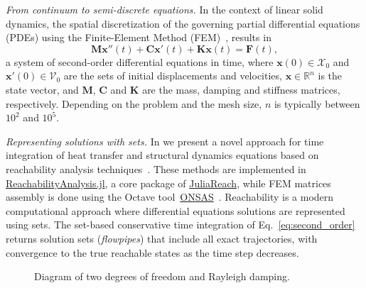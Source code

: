 \documentclass{juliacon}
\begin{document}
	


\maketitle

\emph{From continuum to semi-discrete equations.} In the context of linear solid dynamics, the spatial discretization of the governing partial differential equations (PDEs) using the Finite-Element Method (FEM)~\cite{Bathe2014}, results in
%
\begin{equation}\label{eq:second_order}
\mathbf{M} \mathbf{x}''(t) + \mathbf{C}\mathbf{x}'(t) + \mathbf{K}\mathbf{x}(t) = \mathbf{F}(t),
\end{equation}
%
a system of second-order differential equations in time, where $\mathbf{x}(0) \in \mathcal{X}_0$ and $\mathbf{x}'(0) \in \mathcal{V}_0$ are the sets of initial displacements and velocities, $\mathbf{x} \in \mathbb{R}^n$ is the state vector, and $\mathbf{M}$, $\mathbf{C}$ and $\mathbf{K}$ are the mass, damping and stiffness matrices, respectively. Depending on the problem and the mesh size, $n$ is typically  between $10^2$ and $10^5$.
	
\vspace{0.2cm}

\emph{Representing solutions with sets.} In \cite{forets2021combining} we present a novel approach for time integration of heat transfer and structural dynamics equations based on reachability analysis techniques~\cite{althoff2020set}. These methods are implemented in \href{http://github.com/JuliaReach/ReachabilityAnalysis.jl}{ReachabilityAnalysis.jl}, a core package of \href{http://juliareach.com}{JuliaReach}, while FEM matrices assembly is done using the Octave tool~\href{http://onsas.org}{ONSAS}~\cite{onsas}.
%
Reachability is a modern computational approach where differential equations solutions are represented using sets.
%
The set-based conservative time integration of Eq.~\eqref{eq:second_order} returns solution sets (\emph{flowpipes}) that include all exact trajectories, with convergence to the true reachable states as the time step decreases.

\vspace{-0.1cm}

\begin{figure}[htb]
	\centering
 \def\svgwidth{0.25\textwidth}
 
 \caption{Diagram of two degrees of freedom and Rayleigh damping.}
 \label{fig:diagram}
\end{figure}
\end{document}

